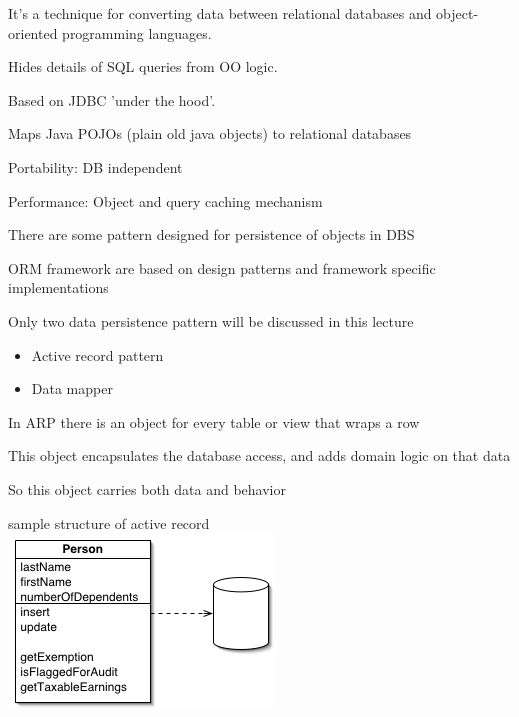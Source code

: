 \documentclass{beamer}
\begin{document}
\begin{slide}{
\item It's a technique for converting data between relational databases and object-oriented programming languages.
\pause
\item Hides details of SQL queries from OO logic.
\pause
\item Based on JDBC 'under the hood'.
\pause 
\item Maps Java POJOs (plain old java objects) to relational databases
\pause 
\item Portability: DB independent
\pause 
\item Performance: Object and query caching mechanism 
}
\end{slide}


\begin{slide}{
\item There are some pattern designed for persistence of objects in DBS
\item ORM framework are based on design patterns and framework specific implementations
\item Only two data persistence pattern will be discussed in this lecture
\pause 
\begin{itemize}
\item Active record pattern
\item Data mapper
\end{itemize}
}\end{slide}

\begin{slide}{
\item In ARP there is an object for every table or view that wraps a row
\item This object encapsulates the database access, and adds domain logic on that data
\pause
\item So this object carries both data and behavior 
}\end{slide}


\begin{slide}{
\item sample structure of active record 
\\
\includegraphics[scale=0.7]{img/activeRecordSketch.png}
}\end{slide}
\end{document}
